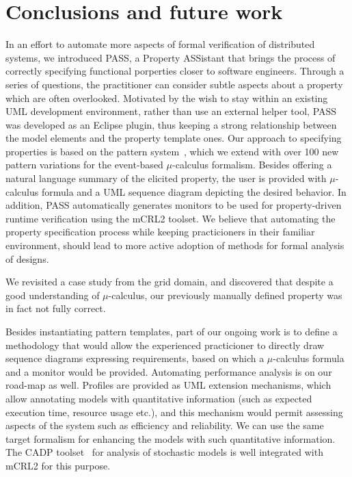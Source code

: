 \documentclass[letter]{llncs}
\begin{document}
\vspace{-23 pt}
\section{Conclusions and future work}
\label{sec:Conclusions}
\vspace{-8 pt}
In an effort to automate more aspects of formal verification of distributed
systems, we introduced PASS, a Property ASSistant that brings the process of
correctly specifying 
functional porperties closer to software engineers.
Through a series of questions, the practitioner can
consider subtle aspects about a property which are often overlooked.
Motivated by the wish to stay within an existing UML development environment,
rather than use an external helper tool, PASS was developed as an Eclipse plugin,
thus keeping a strong relationship between the model elements and the property template ones.
Our approach to specifying properties is based on the pattern system~\cite{Dwyer:1999:PPS:302405.302672},
which we extend with over 100 new pattern variations for the event-based $\mu$-calculus
formalism. Besides offering a natural language summary of the elicited property,
the user is provided with $\mu$-calculus formula and a UML sequence
diagram depicting the desired behavior. In addition, PASS
automatically generates monitors to be used for property-driven 
runtime verification using the mCRL2 toolset. We believe that automating the property specification process while keeping
practicioners in their familiar environment, should lead to more active adoption of methods for formal analysis of designs.

We revisited a case study from the grid domain, and discovered that 
despite a good understanding of $\mu$-calculus, our previously manually
defined property was in fact not fully correct.  

Besides instantiating pattern templates, part of our ongoing work is to define 
a methodology that would allow the experienced practicioner to directly 
draw sequence diagrams expressing requirements, based on which a $\mu$-calculus formula and a monitor 
would be provided. Automating performance analysis is on our road-map as well. 
Profiles are provided as UML extension mechanisms, which allow 
annotating models with quantitative information (such as expected execution time, resource usage etc.),
and this mechanism would permit assessing aspects of the system
such as efficiency and reliability.
We can use the same target formalism for enhancing the models
with such quantitative information. The CADP toolset~\cite{DBLP:conf/tacas/GaravelLMS11} for analysis of stochastic
models is well integrated with mCRL2 for this purpose.
\vspace{-10 pt}
 
\vspace{-3 pt}

\end{document}
